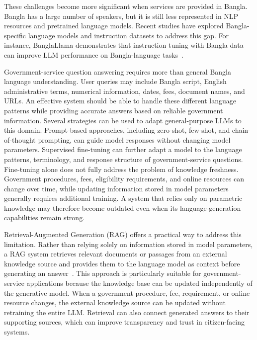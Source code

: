 \documentclass[10pt,journal,compsoc]{IEEEtran}
\begin{document}
These challenges become more significant when services are provided in Bangla. Bangla has a large number of speakers, but it is still less represented in NLP resources and pretrained language models. Recent studies have explored Bangla-specific language models and instruction datasets to address this gap. For instance, BanglaLlama demonstrates that instruction tuning with Bangla data can improve LLM performance on Bangla-language tasks~\cite {zehady-etal-2026-banglallama}.

Government-service question answering requires more than general Bangla language understanding. User queries may include Bangla script, English administrative terms, numerical information, dates, fees, document names, and URLs. An effective system should be able to handle these different language patterns while providing accurate answers based on reliable government information. Several strategies can be used to adapt general-purpose LLMs to this domain. Prompt-based approaches, including zero-shot, few-shot, and chain-of-thought prompting, can guide model responses without changing model parameters. Supervised fine-tuning can further adapt a model to the language patterns, terminology, and response structure of government-service questions. Fine-tuning alone does not fully address the problem of knowledge freshness. Government procedures, fees, eligibility requirements, and online resources can change over time, while updating information stored in model parameters generally requires additional training. A system that relies only on parametric knowledge may therefore become outdated even when its language-generation capabilities remain strong.

Retrieval-Augmented Generation (RAG) offers a practical way to address this limitation. Rather than relying solely on information stored in model parameters, a RAG system retrieves relevant documents or passages from an external knowledge source and provides them to the language model as context before generating an answer~\cite{lewis2020rag}. This approach is particularly suitable for government-service applications because the knowledge base can be updated independently of the generative model. When a government procedure, fee, requirement, or online resource changes, the external knowledge source can be updated without retraining the entire LLM. Retrieval can also connect generated answers to their supporting sources, which can improve transparency and trust in citizen-facing systems.
\end{document}
